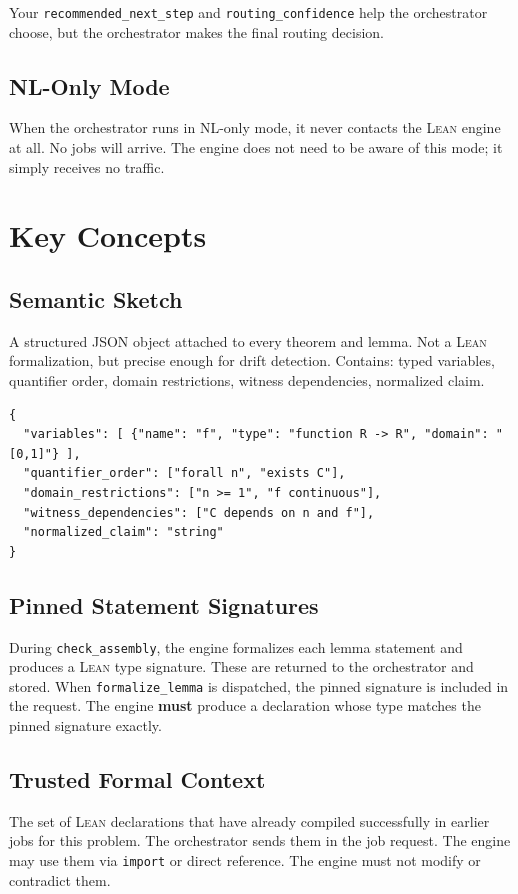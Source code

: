 \documentclass[11pt,a4paper]{article}
\newcommand{\Lean}{\textsc{Lean}}
\begin{document}
Your \texttt{recommended\_next\_step} and \texttt{routing\_confidence} help the orchestrator choose, but the orchestrator makes the final routing decision.

\subsection{NL-Only Mode}
When the orchestrator runs in NL-only mode, it never contacts the \Lean{} engine at all. No jobs will arrive. The engine does not need to be aware of this mode; it simply receives no traffic.

\section{Key Concepts}

\subsection{Semantic Sketch}
A structured JSON object attached to every theorem and lemma. Not a \Lean{} formalization, but precise enough for drift detection. Contains: typed variables, quantifier order, domain restrictions, witness dependencies, normalized claim.

\begin{lstlisting}
{
  "variables": [ {"name": "f", "type": "function R -> R", "domain": "[0,1]"} ],
  "quantifier_order": ["forall n", "exists C"],
  "domain_restrictions": ["n >= 1", "f continuous"],
  "witness_dependencies": ["C depends on n and f"],
  "normalized_claim": "string"
}
\end{lstlisting}

\subsection{Pinned Statement Signatures}
During \texttt{check\_assembly}, the engine formalizes each lemma statement and produces a \Lean{} type signature. These are returned to the orchestrator and stored. When \texttt{formalize\_lemma} is dispatched, the pinned signature is included in the request. The engine \textbf{must} produce a declaration whose type matches the pinned signature exactly.

\subsection{Trusted Formal Context}
The set of \Lean{} declarations that have already compiled successfully in earlier jobs for this problem. The orchestrator sends them in the job request. The engine may use them via \texttt{import} or direct reference. The engine must not modify or contradict them.
\end{document}
